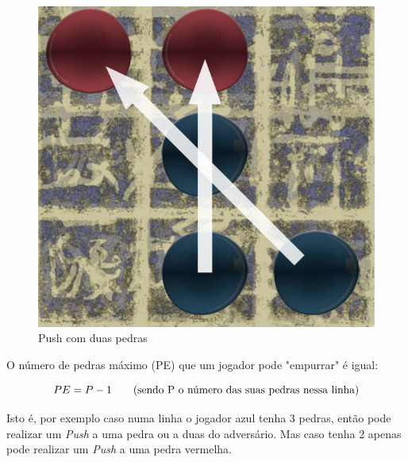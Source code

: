 \documentclass[a4paper]{article}
\begin{document}
\begin{figure}[!htb]
\centering
\includegraphics[scale=0.3]{push.png} 
\caption{Push com duas pedras}
\end{figure}

\clearpage

O número de pedras máximo (PE) que um jogador pode "empurrar" é igual:

\begin{equation}
PE = P - 1 \text{\hspace{7mm}(sendo P o número das suas pedras nessa linha)}
\end{equation}



Isto é, por exemplo caso numa linha o jogador azul tenha 3 pedras, então pode realizar um  \textit{Push} a uma pedra ou a duas do adversário. Mas caso tenha 2 apenas pode realizar um  \textit{Push} a uma pedra vermelha.
\end{document}
